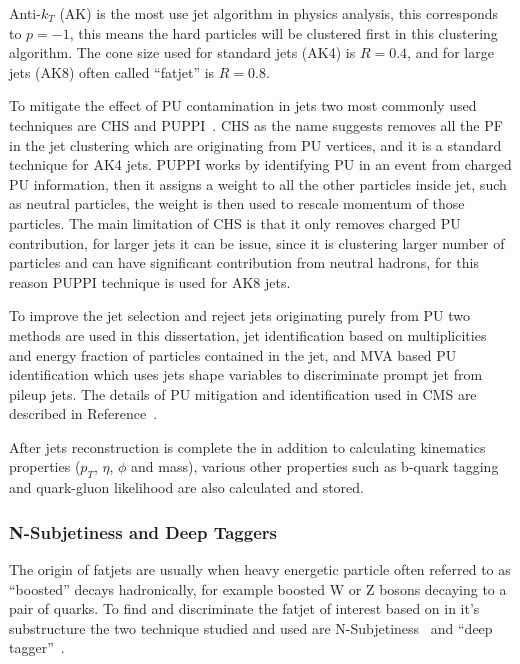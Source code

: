 Anti-\( k_T \) (AK) is the most use jet algorithm in physics analysis, this corresponds to
\( p = -1\), this means the hard particles will be clustered first in this clustering
algorithm.
The cone size used for standard jets (AK4) is \( R = 0.4 \), and for large jets (AK8) often called
``fatjet'' is \( R = 0.8 \).

To mitigate the effect of \gls{PU} contamination in jets two most commonly used
techniques are \gls{CHS} and \gls{PUPPI}~\cite{puppi2014}.
\gls{CHS} as the name suggests removes all the \gls{PF} in the jet clustering which are
originating from \gls{PU} vertices, and it is a standard technique for AK4 jets.
\gls{PUPPI} works by identifying \gls{PU} in an event from charged \gls{PU} information,
then it assigns a weight to all the other particles inside jet, such as neutral particles,
the weight is then used to rescale momentum of those particles.
The main limitation of \gls{CHS} is that it only removes charged \gls{PU} contribution,
for larger jets it can be issue, since it is clustering larger number of particles
and can have significant contribution from neutral hadrons, for this reason \gls{PUPPI}
technique is used for AK8 jets.

To improve the jet selection and reject jets originating purely from \gls{PU}
two methods are used in this dissertation, jet identification based on
multiplicities and energy fraction of particles contained in the jet,
and \gls{MVA} based \gls{PU} identification which uses jets shape
variables to discriminate prompt jet from pileup jets.
The details of \gls{PU} mitigation and identification used in
\gls{CMS} are described in Reference~\cite{cms-jme-pu-run2}.

After jets reconstruction is complete the in addition to calculating kinematics
properties (\( p_T \), \( \eta \), \( \phi \) and mass), various other
properties such as b-quark tagging and quark-gluon likelihood are also
calculated and stored.

\subsubsection{
  N-Subjetiness and Deep Taggers
}

The origin of fatjets are usually when heavy energetic particle
often referred to as ``boosted'' decays hadronically,
for example boosted W or Z bosons decaying to a pair of quarks.
To find and discriminate the fatjet of interest based on in it's substructure
the two technique studied and used are N-Subjetiness~\cite{tau21-paper}
and ``deep tagger''~\cite{cms-jme-deep-tagger}.

